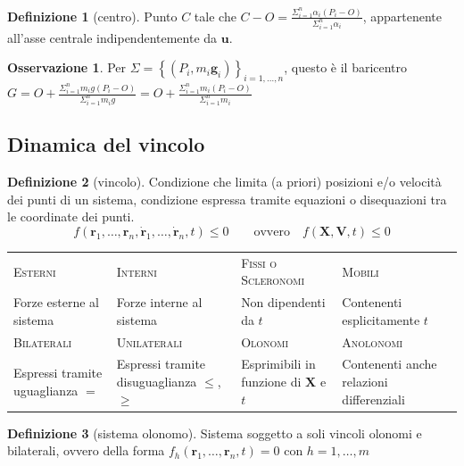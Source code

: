 \documentclass[a4paper,10pt]{article}
\theoremstyle{definition}
\newcommand{\noun}[1]{\textsc{#1}}
\providecommand{\tabularnewline}{\\}
\theoremstyle{indentdefinition}
\newtheorem{defn}{Definizione}[section]
\theoremstyle{indenttheorem}
\theoremstyle{myremark}
\newtheorem*{rem*}{Osservazione}
\theoremstyle{indentgeneral}
\begin{document}
\begin{defn}[centro]
\label{def:centro}Punto $C$ tale che $C-O=\frac{\Sigma_{i=1}^{n}\alpha_{i}\left(P_{i}-O\right)}{\Sigma_{i=1}^{n}\alpha_{i}}$,
appartenente all'asse centrale indipendentemente da $\boldsymbol{u}$.
\end{defn}

\begin{rem*}
Per $\Sigma=\left\{ \left(P_{i},m_{i}\boldsymbol{g}_{i}\right)\right\} _{i=1,\dots,n}$,
questo è il baricentro $G=O+\frac{\Sigma_{i=1}^{n}m_{i}g\left(P_{i}-O\right)}{\Sigma_{i=1}^{n}m_{i}g}=O+\frac{\Sigma_{i=1}^{n}m_{i}\left(P_{i}-O\right)}{\Sigma_{i=1}^{n}m_{i}}$
\end{rem*}

\subsection{Dinamica del vincolo}
\begin{defn}[vincolo]
\label{def:vincolo}Condizione che limita (a priori) posizioni e/o
velocità dei punti di un sistema, condizione espressa tramite equazioni
o disequazioni tra le coordinate dei punti.
\[
f\left(\boldsymbol{r}_{1},\ldots,\boldsymbol{r}_{n},\dot{\boldsymbol{r}}_{1},\ldots,\dot{\boldsymbol{r}}_{n},t\right)\leq0\qquad\text{ovvero}\quad f\left(\boldsymbol{X},\boldsymbol{V},t\right)\leq0
\]
\end{defn}

\begin{center}
\begin{tabular}{|>{\raggedright}p{}|>{\raggedright}p{}||>{\raggedright}p{}>{\raggedright}p{}|}
\hline 
\noun{Esterni} & \noun{Interni} & \noun{Fissi o Scleronomi} & \noun{Mobili}\tabularnewline[\doublerulesep]
Forze esterne al sistema & Forze interne al sistema & Non dipendenti da $t$ & Contenenti esplicitamente $t$\tabularnewline
\hline 
\hline 
\noun{Bilaterali} & \noun{Unilaterali} & \noun{Olonomi} & \noun{Anolonomi}\tabularnewline[\doublerulesep]
Espressi tramite uguaglianza $=$ & Espressi tramite disuguaglianza $\leq$, $\geq$ & Esprimibili in funzione di $\boldsymbol{X}$ e $t$ & Contenenti anche relazioni differenziali\tabularnewline
\hline 
\end{tabular}
\par\end{center}
\begin{defn}[sistema olonomo]
\label{def:sistema-olonomo}Sistema soggetto a soli vincoli olonomi
e bilaterali, ovvero della forma $f_{h}\left(\boldsymbol{r}_{1},\ldots,\boldsymbol{r}_{n},t\right)=0$
con $h=1,\ldots,m$
\end{defn}
\end{document}
